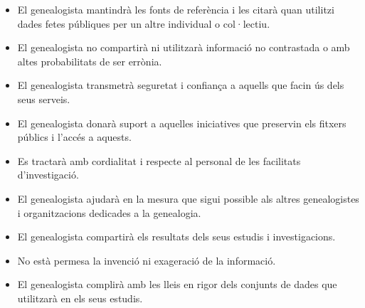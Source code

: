     \begin{itemize}
        \item El genealogista mantindrà les fonts de referència i les citarà quan utilitzi dades fetes públiques per un altre individual o col·lectiu.
        \item El genealogista no compartirà ni utilitzarà informació no contrastada o amb altes probabilitats de ser errònia.
        \item El genealogista transmetrà seguretat i confiança a aquells que facin ús dels seus serveis.
        \item El genealogista donarà suport a aquelles iniciatives que preservin els fitxers públics i l'accés a aquests.
        \item Es tractarà amb cordialitat i respecte al personal de les facilitats d'investigació.
        \item El genealogista ajudarà en la mesura que sigui possible als altres genealogistes i organitzacions dedicades a la genealogia.
        \item El genealogista compartirà els resultats dels seus estudis i investigacions.
        \item No està permesa la invenció ni exageració de la informació.
        \item El genealogista complirà amb les lleis en rigor dels conjunts de dades que utilitzarà en els seus estudis.
    \end{itemize}
